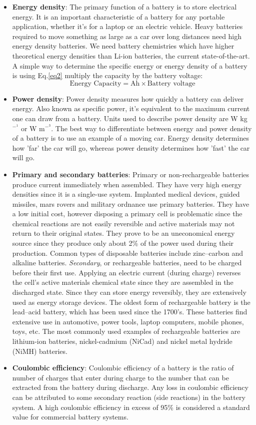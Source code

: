 \begin{itemize}
\item \textbf{Energy density}: The primary function of a battery is to store electrical energy. It is an important characteristic of a battery for any portable application, whether it’s for a laptop or an electric vehicle. Heavy batteries required to move something as large as a car over long distances need high energy density batteries. We need battery chemistries which have higher theoretical energy densities than Li-ion batteries, the current state-of-the-art. A simple way to determine the specific energy or energy density of a battery is using Eq.\ref{eq2} multiply the capacity by the battery voltage:
\begin{equation} \label{eq2}
    \text{Energy Capacity}= \text{Ah} \times \text{Battery voltage}
\end{equation}
\item \textbf{Power density}: Power density measures how quickly a battery can deliver energy. Also known as specific power, it's equivalent to the maximum current one can draw from a battery. Units used to describe power density are W kg$^-^1$ or W m$^-^3$. The best way to differentiate between energy and power density of a battery is to use an example of a moving car. Energy density determines how 'far' the car will go, whereas power density determines how 'fast' the car will go.
\item \textbf{Primary and secondary batteries}: Primary or non-rechargeable batteries produce current immediately when assembled. They have very high energy densities since it is a single-use system. Implanted medical devices, guided missiles, mars rovers and military ordnance use primary batteries. They have a low initial cost, however disposing a primary cell is problematic since the chemical reactions are not easily reversible and active materials may not return to their original states. They prove to be an uneconomical energy source since they produce only about 2\% of the power used during their production. Common types of disposable batteries include zinc–carbon and alkaline batteries. 
\textit{Secondary}, or rechargeable batteries, need to be charged before their first use. Applying an electric current (during charge) reverses the cell's active materials chemical state since they are  assembled in the discharged state. Since they can store energy reversibly, they are extensively used as energy storage devices. The oldest form of rechargeable battery is the lead–acid battery, which has been used since the 1700's. These batteries find extensive use in automotive, power tools, laptop computers, mobile phones, toys, etc. The most commonly used examples of rechargeable batteries are lithium-ion batteries, nickel-cadmium (NiCad) and nickel metal hydride (NiMH) batteries. 
\item \textbf{Coulombic efficiency}: Coulombic efficiency of a battery is the ratio of number of charges that enter during charge to the number that can be extracted from the battery during discharge.  Any loss in coulombic efficiency can be attributed to some secondary reaction (side reactions) in the battery system. A high coulombic efficiency in excess of 95\% is considered a standard value for commercial battery systems.
  
    \end{itemize}

